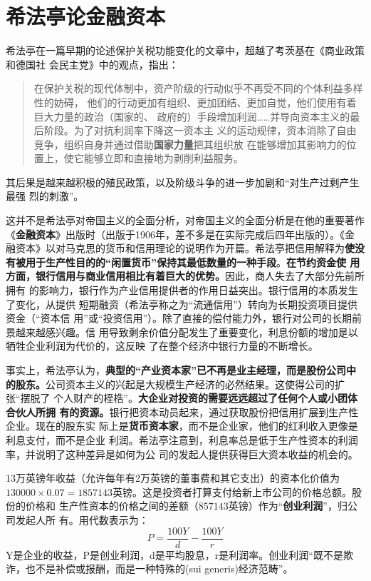 \section{希法亭论金融资本}

希法亭在一篇早期的论述保护关税功能变化的文章中，超越了考茨基在《商业政策和德国社
会民主党》中的观点，指出：
\begin{quotation}
  在保护关税的现代体制中，资产阶级的行动似乎不再受不同的个体利益多样性的妨碍，
  他们的行动更加有组织、更加团结、更加自觉，他们使用有着巨大力量的政治（国家的、
  政府的）手段增加利润……并导向资本主义的最后阶段。为了对抗利润率下降这一资本主
  义的运动规律，资本消除了自由竞争，组织自身并通过借助\textbf{国家力量}把其组织放
  在能够增加其影响力的位置上，使它能够立即和直接地为剥削利益服务。
\end{quotation}
其后果是越来越积极的殖民政策，以及阶级斗争的进一步加剧和“对生产过剩产生最强
烈的刺激”。

这并不是希法亭对帝国主义的全面分析，对帝国主义的全面分析是在他的重要著作
《\textbf{金融资本}》出版时（出版于1906年，差不多是在实际完成后四年出版的）。《金
融资本》以对马克思的货币和信用理论的说明作为开篇。希法亭把信用解释为\textbf{使没
  有被用于生产性目的的“闲置货币”保持其最低数量的一种手段}。\textbf{在节约资金使
  用方面，银行信用与商业信用相比有着巨大的优势。}因此，商人失去了大部分先前所拥有
的影响力，银行作为产业信用提供者的作用日益突出。银行信用的本质发生了变化，从提供
短期融资（希法亭称之为“流通信用”）转向为长期投资项目提供资金（“资本信
用”或“投资信用”）。除了直接的偿付能力外，银行对公司的长期前景越来越感兴趣。信
用导致剩余价值分配发生了重要变化，利息份额的增加是以牺牲企业利润为代价的，这反映
了在整个经济中银行力量的不断增长。

事实上，希法亭认为，\textbf{典型的“产业资本家”已不再是业主经理，而是股份公司中
  的股东。}公司资本主义的兴起是大规模生产经济的必然结果。这使得公司的扩张“摆脱了
个人财产的桎梏”。\textbf{大企业对投资的需要远远超过了任何个人或小团体合伙人所拥
  有的资源。}银行把资本动员起来，通过获取股份把信用扩展到生产性企业。现在的股东实
际上是\textbf{货币资本家}，而不是企业家，他们的红利收入更像是利息支付，而不是企业
利润。希法亭注意到，利息率总是低于生产性资本的利润率，并说明了这种差异是如何为公
司的发起人提供获得巨大资本收益的机会的。

13万英镑年收益（允许每年有2万英镑的董事费和其它支出）的资本化价值为$130000
\times 0.07=1857143$英镑。这是投资者打算支付给新上市公司的价格总额。股份的价格和
生产性资本的价格之间的差额（$857143$英镑）作为“\textbf{创业利润}”，归公司发起人所
有。用代数表示为：
\[ P = \frac{100Y}{d} - \frac{100Y}{r} \] 
Y是企业的收益，P是创业利润，d是平均股息，r是利润率。创业利润“既不是欺诈，也不是补偿或报酬，而是一种特殊的(sui generis)经济范畴”。

